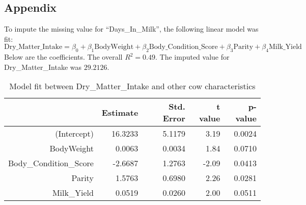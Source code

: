 \documentclass[12pt]{article}
\begin{document}
\newpage
\begin{appendix}
\section*{Appendix} \label{Appendix}
\noindent
To impute the missing value for ``Days\_In\_Milk'', the following linear model was fit:
\[ \text{Dry\_Matter\_Intake} = \beta_0 + \beta_1 \text{BodyWeight} + \beta_2 \text{Body\_Condition\_Score} + \beta_3 \text{Parity} + \beta_4 \text{Milk\_Yield}  \]
Below are the coefficients. The overall $R^2 = 0.49$. The imputed value for Dry\_Matter\_Intake was $29.2126$. 
\begin{table}[ht]
\centering
\begin{tabular}{rrrrr}
  \hline
  & Estimate & Std. Error & t value & p-value \\ 
  \hline
 (Intercept) & 16.3233 & 5.1179 & 3.19 & 0.0024 \\ 
  BodyWeight & 0.0063 & 0.0034 & 1.84 & 0.0710 \\ 
  Body\_Condition\_Score & -2.6687 & 1.2763 & -2.09 & 0.0413 \\ 
  Parity & 1.5763 & 0.6980 & 2.26 & 0.0281 \\ 
  Milk\_Yield & 0.0519 & 0.0260 & 2.00 & 0.0511 \\ 
  \hline
\end{tabular}
\caption{Model fit between Dry\_Matter\_Intake and other cow characteristics}
\end{table}
\end{appendix}
\end{document}
